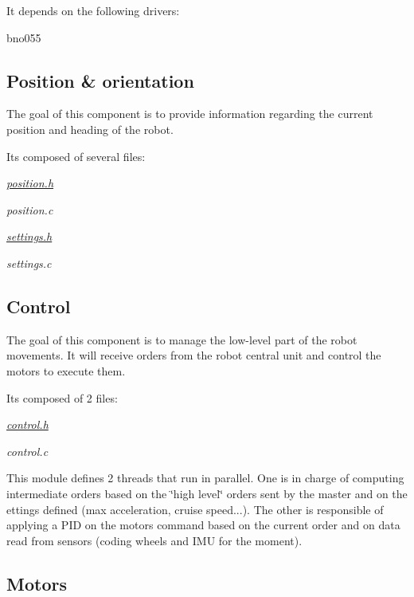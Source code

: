 It depends on the following drivers\+:
\begin{DoxyItemize}
\item bno055
\end{DoxyItemize}

\subsection*{Position \& orientation}

The goal of this component is to provide information regarding the current position and heading of the robot.

It\textquotesingle{}s composed of several files\+:
\begin{DoxyItemize}
\item {\itshape \hyperlink{position_8h_source}{position.\+h}}
\item {\itshape position.\+c}
\item {\itshape \hyperlink{settings_8h_source}{settings.\+h}}
\item {\itshape settings.\+c}
\end{DoxyItemize}

\subsection*{Control}

The goal of this component is to manage the low-\/level part of the robot movements. It will receive orders from the robot central unit and control the motors to execute them.

It\textquotesingle{}s composed of 2 files\+:
\begin{DoxyItemize}
\item {\itshape \hyperlink{control_8h_source}{control.\+h}}
\item {\itshape control.\+c}
\end{DoxyItemize}

This module defines 2 threads that run in parallel. One is in charge of computing intermediate orders based on the \char`\"{}high level\char`\"{} orders sent by the master and on the ettings defined (max acceleration, cruise speed...). The other is responsible of applying a P\+ID on the motors command based on the current order and on data read from sensors (coding wheels and I\+MU for the moment).

\subsection*{Motors}

